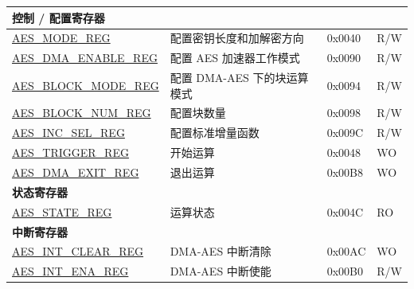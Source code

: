 \begin{longtable}{ | p{5.2cm} | p{6.6cm} | p{2cm} | p{1.2cm} | }
\multicolumn{4}{|l|}{\textbf{控制 / 配置寄存器}} \\ \hline

\hyperref[regdesc:AESMODEREG]{AES\_MODE\_REG}				            & 配置密钥长度和加解密方向			    & 0x0040 & R/W \\ \hline
\hyperref[regdesc:AESDMAENABLEREG]{AES\_DMA\_ENABLE\_REG}		        &	配置 AES 加速器工作模式					                & 0x0090 & R/W \\ \hline
\hyperref[regdesc:AESBLOCKMODEREG]{AES\_BLOCK\_MODE\_REG}		        &	配置 DMA-AES 下的块运算模式			        & 0x0094 & R/W \\ \hline
\hyperref[regdesc:AESBLOCKNUMREG]{AES\_BLOCK\_NUM\_REG}		   	        &	配置块数量			        & 0x0098 & R/W \\ \hline
\hyperref[regdesc:AESINCSELREG]{AES\_INC\_SEL\_REG}			            &	配置标准增量函数               & 0x009C & R/W \\ \hline
\hyperref[regdesc:AESTRIGGERREG]{AES\_TRIGGER\_REG}			&	开始运算		& 0x0048 & WO \\ \hline
\hyperref[regdesc:AESDMAEXITREG]{AES\_DMA\_EXIT\_REG}		&	退出运算	& 0x00B8 & WO \\ \hline

\multicolumn{4}{|l|}{\textbf{状态寄存器}} \\ \hline

\hyperref[regdesc:AESSTATEREG]{AES\_STATE\_REG}				&	运算状态			& 0x004C & RO \\ \hline

\multicolumn{4}{|l|}{\textbf{中断寄存器}} \\ \hline

\hyperref[regdesc:AESINTCLEARREG]{AES\_INT\_CLEAR\_REG}			&	DMA-AES 中断清除	& 0x00AC & WO \\ \hline
\hyperref[regdesc:AESINTENAREG]{AES\_INT\_ENA\_REG}			&	DMA-AES 中断使能	& 0x00B0 & R/W \\ \hline

\end{longtable}
